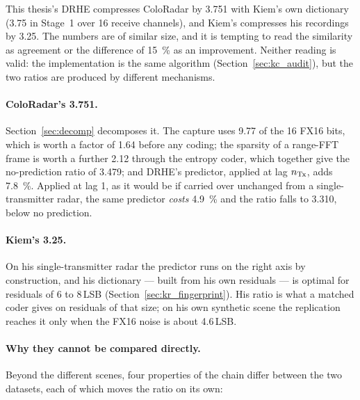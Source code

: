 This thesis's DRHE compresses ColoRadar by \num{3.751} with Kiem's own
dictionary (\num{3.75} in Stage~1 over 16 receive channels), and Kiem's
compresses his recordings by \num{3.25}. The numbers are of similar size, and it
is tempting to read the similarity as agreement or the difference of
\SI{15}{\percent} as an improvement. Neither reading is valid: the
implementation is the same algorithm (Section~\ref{sec:kc_audit}), but the two
ratios are produced by different mechanisms.

\paragraph{ColoRadar's 3.751.} Section~\ref{sec:decomp} decomposes it. The capture uses 9.77 of the 16
FX16 bits, which is worth a factor of \num{1.64} before any coding; the sparsity
of a range-FFT frame is worth a further \num{2.12} through the entropy coder,
which together give the no-prediction ratio of \num{3.479}; and DRHE's
predictor, applied at lag $n_{\mathrm{Tx}}$, adds \SI{7.8}{\percent}. Applied at lag 1,
as it would be if carried over unchanged from a single-transmitter radar, the
same predictor \emph{costs} \SI{4.9}{\percent} and the ratio falls to
\num{3.310}, below no prediction.

\paragraph{Kiem's 3.25.} On his single-transmitter radar the predictor runs on
the right axis by construction, and his dictionary --- built from his own
residuals --- is optimal for residuals of 6 to 8\,LSB
(Section~\ref{sec:kr_fingerprint}). His ratio is what a matched coder gives on
residuals of that size; on his own synthetic scene the replication reaches it
only when the FX16 noise is about 4.6\,LSB.

\paragraph{Why they cannot be compared directly.} Beyond the different scenes,
four properties of the chain differ between the two datasets, each of which moves
the ratio on its own:

